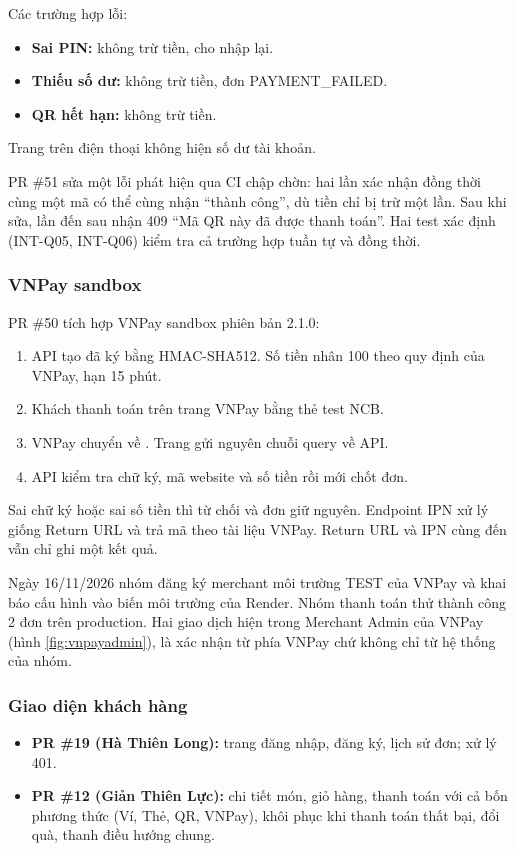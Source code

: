 Các trường hợp lỗi:
\begin{itemize}
\item \textbf{Sai PIN:} không trừ tiền, cho nhập lại.
\item \textbf{Thiếu số dư:} không trừ tiền, đơn PAYMENT\_FAILED.
\item \textbf{QR hết hạn:} không trừ tiền.
\end{itemize}

Trang trên điện thoại không hiện số dư tài khoản.

PR \#51 sửa một lỗi phát hiện qua CI chập chờn: hai lần xác nhận đồng thời cùng một mã có thể cùng nhận ``thành công'', dù tiền chỉ bị trừ một lần. Sau khi sửa, lần đến sau nhận 409 ``Mã QR này đã được thanh toán''. Hai test xác định (INT-Q05, INT-Q06) kiểm tra cả trường hợp tuần tự và đồng thời.

\subsubsection{VNPay sandbox}
PR \#50 tích hợp VNPay sandbox phiên bản 2.1.0:
\begin{enumerate}
\item API tạo  đã ký bằng HMAC-SHA512. Số tiền nhân 100 theo quy định của VNPay, hạn 15 phút.
\item Khách thanh toán trên trang VNPay bằng thẻ test NCB.
\item VNPay chuyển về . Trang gửi nguyên chuỗi query về API.
\item API kiểm tra chữ ký, mã website và số tiền rồi mới chốt đơn.
\end{enumerate}

Sai chữ ký hoặc sai số tiền thì từ chối và đơn giữ nguyên. Endpoint IPN xử lý giống Return URL và trả mã theo tài liệu VNPay. Return URL và IPN cùng đến vẫn chỉ ghi một kết quả.

Ngày 16/11/2026 nhóm đăng ký merchant môi trường TEST của VNPay và khai báo cấu hình vào biến môi trường của Render. Nhóm thanh toán thử thành công 2 đơn trên production. Hai giao dịch hiện trong Merchant Admin của VNPay (hình \ref{fig:vnpayadmin}), là xác nhận từ phía VNPay chứ không chỉ từ hệ thống của nhóm.

\subsubsection{Giao diện khách hàng}
\begin{itemize}
\item \textbf{PR \#19 (Hà Thiên Long):} trang đăng nhập, đăng ký, lịch sử đơn; xử lý 401.
\item \textbf{PR \#12 (Giản Thiên Lực):} chi tiết món, giỏ hàng, thanh toán với cả bốn phương thức (Ví, Thẻ, QR, VNPay), khôi phục khi thanh toán thất bại, đổi quà, thanh điều hướng chung.
\end{itemize}

